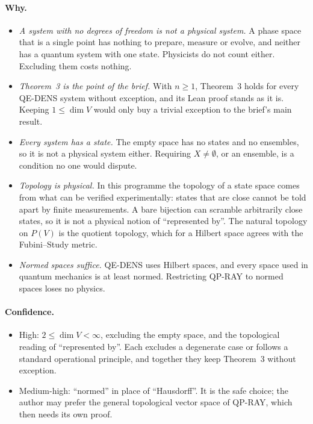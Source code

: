 \documentclass[11pt]{article}
\begin{document}
\paragraph{Why.}
\begin{itemize}
\item \emph{A system with no degrees of freedom is not a physical system.} A phase space that
  is a single point has nothing to prepare, measure or evolve, and neither has a quantum system
  with one state. Physicists do not count either. Excluding them costs nothing.
\item \emph{Theorem~3 is the point of the brief.} With $n \ge 1$, Theorem~3 holds for every
  QE-DENS system without exception, and its Lean proof stands as it is. Keeping
  $1 \le \dim V$ would only buy a trivial exception to the brief's main result.
\item \emph{Every system has a state.} The empty space has no states and no ensembles, so it
  is not a physical system either. Requiring $X \ne \emptyset$, or an ensemble, is a
  condition no one would dispute.
\item \emph{Topology is physical.} In this programme the topology of a state space comes from
  what can be verified experimentally: states that are close cannot be told apart by finite
  measurements. A bare bijection can scramble arbitrarily close states, so it is not a
  physical notion of ``represented by''. The natural topology on $P(V)$ is the quotient
  topology, which for a Hilbert space agrees with the Fubini--Study metric.
\item \emph{Normed spaces suffice.} QE-DENS uses Hilbert spaces, and every space used in
  quantum mechanics is at least normed. Restricting QP-RAY to normed spaces loses no physics.
\end{itemize}

\paragraph{Confidence.}
\begin{itemize}
\item High: $2 \le \dim V < \infty$, excluding the empty space, and the topological reading of
  ``represented by''. Each excludes a degenerate case or follows a standard operational
  principle, and together they keep Theorem~3 without exception.
\item Medium-high: ``normed'' in place of ``Hausdorff''. It is the safe choice; the author may
  prefer the general topological vector space of QP-RAY, which then needs its own proof.
\end{itemize}
\end{document}
